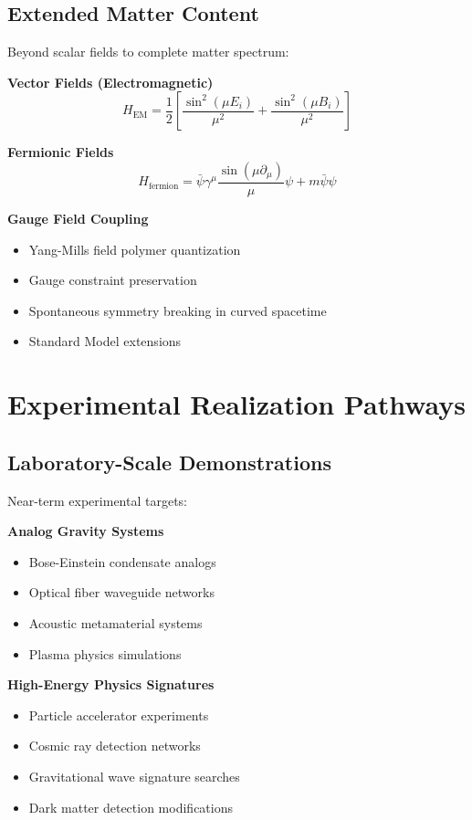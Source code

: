 \documentclass[11pt]{article}
\begin{document}
\subsection{Extended Matter Content}

Beyond scalar fields to complete matter spectrum:

\textbf{Vector Fields (Electromagnetic)}
\begin{equation}
H_{\text{EM}} = \frac{1}{2}\left[\frac{\sin^2(\mu E_i)}{\mu^2} + \frac{\sin^2(\mu B_i)}{\mu^2}\right]
\end{equation}

\textbf{Fermionic Fields}
\begin{equation}
H_{\text{fermion}} = \bar{\psi}\gamma^\mu \frac{\sin(\mu \partial_\mu)}{\mu}\psi + m\bar{\psi}\psi
\end{equation}

\textbf{Gauge Field Coupling}
\begin{itemize}
\item Yang-Mills field polymer quantization
\item Gauge constraint preservation
\item Spontaneous symmetry breaking in curved spacetime
\item Standard Model extensions
\end{itemize}

\section{Experimental Realization Pathways}

\subsection{Laboratory-Scale Demonstrations}

Near-term experimental targets:

\textbf{Analog Gravity Systems}
\begin{itemize}
\item Bose-Einstein condensate analogs
\item Optical fiber waveguide networks
\item Acoustic metamaterial systems
\item Plasma physics simulations
\end{itemize}

\textbf{High-Energy Physics Signatures}
\begin{itemize}
\item Particle accelerator experiments
\item Cosmic ray detection networks
\item Gravitational wave signature searches
\item Dark matter detection modifications
\end{itemize}
\end{document}
